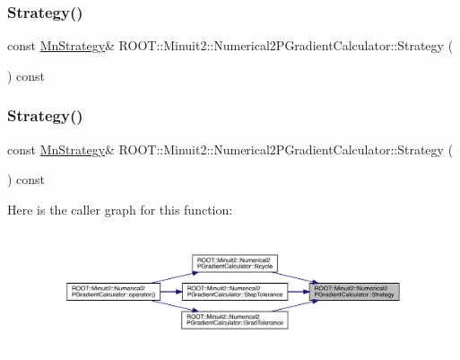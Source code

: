 \subsubsection{\texorpdfstring{Strategy()}{Strategy()}\hspace{0.1cm}{\footnotesize\ttfamily [2/3]}}
{\footnotesize\ttfamily const \mbox{\hyperlink{classROOT_1_1Minuit2_1_1MnStrategy}{Mn\+Strategy}}\& R\+O\+O\+T\+::\+Minuit2\+::\+Numerical2\+P\+Gradient\+Calculator\+::\+Strategy (\begin{DoxyParamCaption}{ }\end{DoxyParamCaption}) const\hspace{0.3cm}{\ttfamily [inline]}}

\mbox{\label{classROOT_1_1Minuit2_1_1Numerical2PGradientCalculator_a71eb0622c53ddf5d3d319fa676cbbd6e}} 
\subsubsection{\texorpdfstring{Strategy()}{Strategy()}\hspace{0.1cm}{\footnotesize\ttfamily [3/3]}}
{\footnotesize\ttfamily const \mbox{\hyperlink{classROOT_1_1Minuit2_1_1MnStrategy}{Mn\+Strategy}}\& R\+O\+O\+T\+::\+Minuit2\+::\+Numerical2\+P\+Gradient\+Calculator\+::\+Strategy (\begin{DoxyParamCaption}{ }\end{DoxyParamCaption}) const\hspace{0.3cm}{\ttfamily [inline]}}

Here is the caller graph for this function\+:
\nopagebreak
\begin{figure}[H]
\begin{center}
\leavevmode
\includegraphics[width=350pt]{d0/d82/classROOT_1_1Minuit2_1_1Numerical2PGradientCalculator_a71eb0622c53ddf5d3d319fa676cbbd6e_icgraph}
\end{center}
\end{figure}
\mbox{\label{classROOT_1_1Minuit2_1_1Numerical2PGradientCalculator_a5a0bce9f2c00da4aae9a2b6d3b706010}} 
